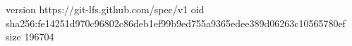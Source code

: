 version https://git-lfs.github.com/spec/v1
oid sha256:fe14251d970c96802c86deb1ef99b9ed755a9365edee389d06263c10565780ef
size 196704
